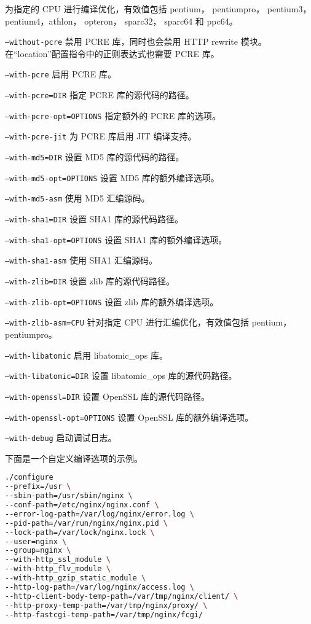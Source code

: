 \begin{compactitem}
为指定的 CPU 进行编译优化，有效值包括 pentium， pentiumpro， pentium3， pentium4，athlon， opteron， sparc32， sparc64 和 ppc64。
\item \texttt{--without-pcre}
禁用 PCRE 库，同时也会禁用 HTTP rewrite 模块。在“location”配置指令中的正则表达式也需要 PCRE 库。
\item \texttt{--with-pcre}
启用 PCRE 库。
\item \texttt{--with-pcre=DIR}
指定 PCRE 库的源代码的路径。
\item \texttt{--with-pcre-opt=OPTIONS}
指定额外的 PCRE 库的选项。
\item \texttt{--with-pcre-jit}
为 PCRE 库启用 JIT 编译支持。
\item \texttt{--with-md5=DIR}
设置 MD5 库的源代码的路径。
\item \texttt{--with-md5-opt=OPTIONS}
设置 MD5 库的额外编译选项。
\item \texttt{--with-md5-asm}
使用 MD5 汇编源码。
\item \texttt{--with-sha1=DIR}
设置 SHA1 库的源代码路径。
\item \texttt{--with-sha1-opt=OPTIONS}
设置 SHA1 库的额外编译选项。
\item \texttt{--with-sha1-asm}
使用 SHA1 汇编源码。
\item \texttt{--with-zlib=DIR}
设置 zlib 库的源代码路径。
\item \texttt{--with-zlib-opt=OPTIONS}
设置 zlib 库的额外编译选项。
\item \texttt{--with-zlib-asm=CPU}
针对指定 CPU 进行汇编优化，有效值包括 pentium， pentiumpro。
\item \texttt{--with-libatomic}
启用 libatomic\_ops 库。
\item \texttt{--with-libatomic=DIR}
设置 libatomic\_ops 库的源代码路径。
\item \texttt{--with-openssl=DIR}
设置 OpenSSL 库的源代码路径。
\item \texttt{--with-openssl-opt=OPTIONS}
设置 OpenSSL 库的额外编译选项。
\item \texttt{--with-debug}
启动调试日志。
\end{compactitem}



下面是一个自定义编译选项的示例。

\begin{lstlisting}[language=bash]
./configure
--prefix=/usr \
--sbin-path=/usr/sbin/nginx \
--conf-path=/etc/nginx/nginx.conf \
--error-log-path=/var/log/nginx/error.log \
--pid-path=/var/run/nginx/nginx.pid \
--lock-path=/var/lock/nginx.lock \
--user=nginx \
--group=nginx \
--with-http_ssl_module \
--with-http_flv_module \
--with-http_gzip_static_module \
--http-log-path=/var/log/nginx/access.log \
--http-client-body-temp-path=/var/tmp/nginx/client/ \
--http-proxy-temp-path=/var/tmp/nginx/proxy/ \
--http-fastcgi-temp-path=/var/tmp/nginx/fcgi/
\end{lstlisting}

